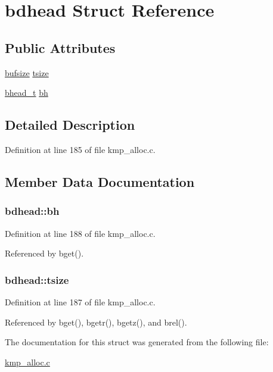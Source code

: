\hypertarget{structbdhead}{\section{bdhead Struct Reference}
\label{structbdhead}
}
\subsection*{Public Attributes}
\begin{DoxyCompactItemize}
\item 
\hyperlink{kmp__alloc_8c_acb70eb20828ff76ed9200989f7dcd043}{bufsize} \hyperlink{structbdhead_aac93883268daeee61a9fc08d36a76147}{tsize}
\item 
\hyperlink{kmp__alloc_8c_af1de790fdc3ba84111ab8cd6730510bd}{bhead\-\_\-t} \hyperlink{structbdhead_a18184e6403b513e03bfc8c3e91fb5aa4}{bh}
\end{DoxyCompactItemize}


\subsection{Detailed Description}


Definition at line 185 of file kmp\-\_\-alloc.\-c.



\subsection{Member Data Documentation}
\hypertarget{structbdhead_a18184e6403b513e03bfc8c3e91fb5aa4}{
\subsubsection[{bh}]{ bdhead\-::bh}}\label{structbdhead_a18184e6403b513e03bfc8c3e91fb5aa4}


Definition at line 188 of file kmp\-\_\-alloc.\-c.



Referenced by bget().

\hypertarget{structbdhead_aac93883268daeee61a9fc08d36a76147}{
\subsubsection[{tsize}]{ bdhead\-::tsize}}\label{structbdhead_aac93883268daeee61a9fc08d36a76147}


Definition at line 187 of file kmp\-\_\-alloc.\-c.



Referenced by bget(), bgetr(), bgetz(), and brel().



The documentation for this struct was generated from the following file\-:\begin{DoxyCompactItemize}
\item 
\hyperlink{kmp__alloc_8c}{kmp\-\_\-alloc.\-c}\end{DoxyCompactItemize}
